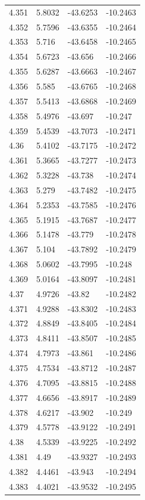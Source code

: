 \begin{tabular}{llll}
4.351 & 5.8032 & -43.6253 & -10.2463 \\
4.352 & 5.7596 & -43.6355 & -10.2464 \\
4.353 & 5.716 & -43.6458 & -10.2465 \\
4.354 & 5.6723 & -43.656 & -10.2466 \\
4.355 & 5.6287 & -43.6663 & -10.2467 \\
4.356 & 5.585 & -43.6765 & -10.2468 \\
4.357 & 5.5413 & -43.6868 & -10.2469 \\
4.358 & 5.4976 & -43.697 & -10.247 \\
4.359 & 5.4539 & -43.7073 & -10.2471 \\
4.36 & 5.4102 & -43.7175 & -10.2472 \\
4.361 & 5.3665 & -43.7277 & -10.2473 \\
4.362 & 5.3228 & -43.738 & -10.2474 \\
4.363 & 5.279 & -43.7482 & -10.2475 \\
4.364 & 5.2353 & -43.7585 & -10.2476 \\
4.365 & 5.1915 & -43.7687 & -10.2477 \\
4.366 & 5.1478 & -43.779 & -10.2478 \\
4.367 & 5.104 & -43.7892 & -10.2479 \\
4.368 & 5.0602 & -43.7995 & -10.248 \\
4.369 & 5.0164 & -43.8097 & -10.2481 \\
4.37 & 4.9726 & -43.82 & -10.2482 \\
4.371 & 4.9288 & -43.8302 & -10.2483 \\
4.372 & 4.8849 & -43.8405 & -10.2484 \\
4.373 & 4.8411 & -43.8507 & -10.2485 \\
4.374 & 4.7973 & -43.861 & -10.2486 \\
4.375 & 4.7534 & -43.8712 & -10.2487 \\
4.376 & 4.7095 & -43.8815 & -10.2488 \\
4.377 & 4.6656 & -43.8917 & -10.2489 \\
4.378 & 4.6217 & -43.902 & -10.249 \\
4.379 & 4.5778 & -43.9122 & -10.2491 \\
4.38 & 4.5339 & -43.9225 & -10.2492 \\
4.381 & 4.49 & -43.9327 & -10.2493 \\
4.382 & 4.4461 & -43.943 & -10.2494 \\
4.383 & 4.4021 & -43.9532 & -10.2495 \\

\end{tabular}
